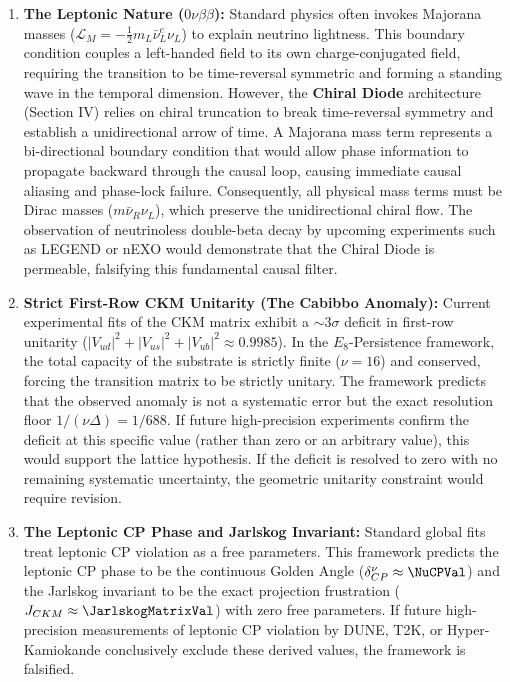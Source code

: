 \begin{enumerate}
    \item \textbf{The Leptonic Nature ($0\nu\beta\beta$):} Standard physics often invokes Majorana masses ($\mathcal{L}_{M} = -\frac{1}{2}m_L \bar{\nu}_L^c \nu_L$) to explain neutrino lightness. This boundary condition couples a left-handed field to its own charge-conjugated field, requiring the transition to be time-reversal symmetric and forming a standing wave in the temporal dimension. However, the \textbf{Chiral Diode} architecture (Section IV) relies on chiral truncation to break time-reversal symmetry and establish a unidirectional arrow of time. A Majorana mass term represents a bi-directional boundary condition that would allow phase information to propagate backward through the causal loop, causing immediate causal aliasing and phase-lock failure. Consequently, all physical mass terms must be Dirac masses ($m \bar{\nu}_R \nu_L$), which preserve the unidirectional chiral flow. The observation of neutrinoless double-beta decay by upcoming experiments such as LEGEND or nEXO would demonstrate that the Chiral Diode is permeable, falsifying this fundamental causal filter.
    
    \item \textbf{Strict First-Row CKM Unitarity (The Cabibbo Anomaly):} Current experimental fits of the CKM matrix exhibit a $\sim 3\sigma$ deficit in first-row unitarity ($|V_{ud}|^2 + |V_{us}|^2 + |V_{ub}|^2 \approx 0.9985$). In the $E_8$-Persistence framework, the total capacity of the substrate is strictly finite ($\nu=16$) and conserved, forcing the transition matrix to be strictly unitary. The framework predicts that the observed anomaly is not a systematic error but the exact resolution floor $1/(\nu\Delta) = 1/688$. If future high-precision experiments confirm the deficit at this specific value (rather than zero or an arbitrary value), this would support the lattice hypothesis. If the deficit is resolved to zero with no remaining systematic uncertainty, the geometric unitarity constraint would require revision.
    
    \item \textbf{The Leptonic CP Phase and Jarlskog Invariant:} Standard global fits treat leptonic CP violation as a free parameters. This framework predicts the leptonic CP phase to be the continuous Golden Angle ($\delta_{CP}^\nu \approx \mathbf{\NuCPVal}$) and the Jarlskog invariant to be the exact projection frustration ($J_{CKM} \approx \mathbf{\JarlskogMatrixVal}$) with zero free parameters. If future high-precision measurements of leptonic CP violation by DUNE, T2K, or Hyper-Kamiokande conclusively exclude these derived values, the framework is falsified.
    

\end{enumerate}
